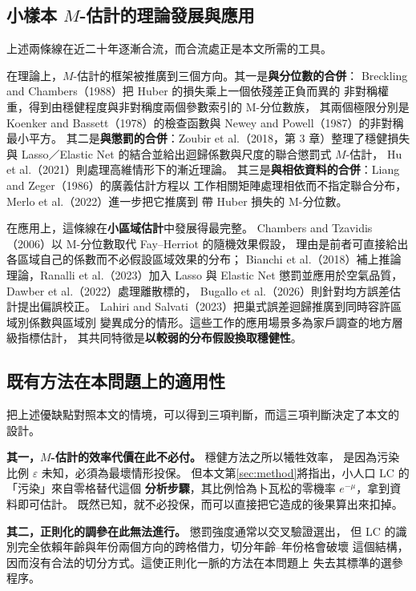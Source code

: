 \documentclass[UTF8, fontset=macnew, a4paper, 12pt]{ctexart}
\begin{document}
\subsection{小樣本 $M$-估計的理論發展與應用}

上述兩條線在近二十年逐漸合流，而合流處正是本文所需的工具。

在理論上，$M$-估計的框架被推廣到三個方向。其一是\textbf{與分位數的合併}：
Breckling and Chambers（1988）把 Huber 的損失乘上一個依殘差正負而異的
非對稱權重，得到由穩健程度與非對稱度兩個參數索引的 M-分位數族，
其兩個極限分別是 Koenker and Bassett（1978）的檢查函數與
Newey and Powell（1987）的非對稱最小平方。
其二是\textbf{與懲罰的合併}：Zoubir et al.（2018，第 3 章）整理了穩健損失
與 Lasso／Elastic Net 的結合並給出迴歸係數與尺度的聯合懲罰式 $M$-估計，
Hu et al.（2021）則處理高維情形下的漸近理論。
其三是\textbf{與相依資料的合併}：Liang and Zeger（1986）的廣義估計方程以
工作相關矩陣處理相依而不指定聯合分布，Merlo et al.（2022）進一步把它推廣到
帶 Huber 損失的 M-分位數。

在應用上，這條線在\textbf{小區域估計}中發展得最完整。
Chambers and Tzavidis（2006）以 M-分位數取代 Fay--Herriot 的隨機效果假設，
理由是前者可直接給出各區域自己的係數而不必假設區域效果的分布；
Bianchi et al.（2018）補上推論理論，Ranalli et al.（2023）加入 Lasso 與
Elastic Net 懲罰並應用於空氣品質，Dawber et al.（2022）處理離散標的，
Bugallo et al.（2026）則針對均方誤差估計提出偏誤校正。
Lahiri and Salvati（2023）把巢式誤差迴歸推廣到同時容許區域別係數與區域別
變異成分的情形。這些工作的應用場景多為家戶調查的地方層級指標估計，
其共同特徵是\textbf{以較弱的分布假設換取穩健性}。

\subsection{既有方法在本問題上的適用性}

把上述優缺點對照本文的情境，可以得到三項判斷，而這三項判斷決定了本文的
設計。

\textbf{其一，$M$-估計的效率代價在此不必付。} 穩健方法之所以犧牲效率，
是因為污染比例 $\varepsilon$ 未知，必須為最壞情形投保。
但本文第\ref{sec:method}將指出，小人口 LC 的「污染」來自零格替代這個
\textbf{分析步驟}，其比例恰為卜瓦松的零機率 $e^{-\mu}$，拿到資料即可估計。
既然已知，就不必投保，而可以直接把它造成的後果算出來扣掉。

\textbf{其二，正則化的調參在此無法進行。} 懲罰強度通常以交叉驗證選出，
但 LC 的識別完全依賴年齡與年份兩個方向的跨格借力，切分年齡--年份格會破壞
這個結構，因而沒有合法的切分方式。這使正則化一脈的方法在本問題上
失去其標準的選參程序。
\end{document}
